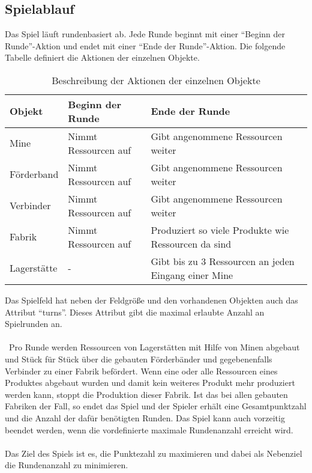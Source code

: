 \subsection{Spielablauf}
Das Spiel läuft rundenbasiert ab. Jede Runde beginnt mit einer “Beginn der Runde”-Aktion und endet mit einer “Ende der Runde”-Aktion.
Die folgende Tabelle definiert die Aktionen der einzelnen Objekte. 
\begin{table}[htp]
\begin{center}
\begin{tabular}{ | l | l | l | } 
	\hline
	\textbf{Objekt}& \textbf{Beginn der Runde} & \textbf{Ende der Runde} \\ \hline
	Mine & Nimmt Ressourcen auf & Gibt angenommene Ressourcen weiter \\ \hline
	Förderband & Nimmt Ressourcen auf & Gibt angenommene Ressourcen weiter \\ \hline
	Verbinder & Nimmt Ressourcen auf & Gibt angenommene Ressourcen weiter \\ \hline
	Fabrik & Nimmt Ressourcen auf & Produziert so viele Produkte wie Ressourcen da sind \\ \hline
	Lagerstätte & - & Gibt bis zu 3 Ressourcen an jeden Eingang einer Mine \\ \hline
\end{tabular}
\caption{Beschreibung der Aktionen der einzelnen Objekte}
\end{center}
\end{table}
Das Spielfeld hat neben der Feldgröße und den vorhandenen Objekten auch das Attribut “turns”. Dieses Attribut gibt die maximal erlaubte Anzahl an Spielrunden an.
\\\\\
Pro Runde werden Ressourcen von Lagerstätten mit Hilfe von Minen abgebaut und Stück für Stück über die gebauten Förderbänder und gegebenenfalls Verbinder zu einer Fabrik befördert. Wenn eine oder alle Ressourcen eines Produktes abgebaut wurden und damit kein weiteres Produkt mehr produziert werden kann, stoppt die Produktion dieser Fabrik. Ist das bei allen gebauten Fabriken der Fall, so endet das Spiel und der Spieler erhält eine Gesamtpunktzahl und die Anzahl der dafür benötigten Runden. Das Spiel kann auch vorzeitig beendet werden, wenn die vordefinierte maximale Rundenanzahl erreicht wird.
\\\\
Das Ziel des Spiels ist es, die Punktezahl zu maximieren und dabei als Nebenziel die Rundenanzahl zu minimieren.


